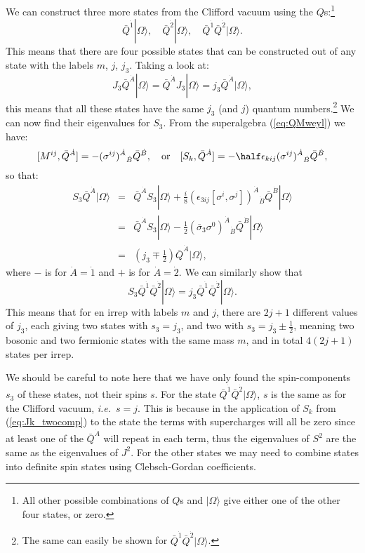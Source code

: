 \documentclass[notes.tex]{subfiles}
\begin{document}
We can construct three more states from the Clifford vacuum using the $Q$s:\footnote{All other possible combinations of $Q$s and $|\Omega\rangle$ give either one of the other four states, or zero.}
\[\bar{Q}^{\dot{1}}|\Omega\rangle,\quad\bar{Q}^{\dot{2}}|\Omega\rangle,\quad\bar{Q}^{\dot{1}}\bar{Q}^{\dot{2}}|\Omega\rangle.\]
This means that there are four possible states that can be constructed out of any state with the labels $m$, $j$, $j_3$. Taking a look at:
\[J_3 \bar{Q}^{\dot{A}}|\Omega\rangle = \bar{Q}^{\dot{A}}J_3 |\Omega\rangle = j_3\bar{Q}^{\dot{A}}|\Omega\rangle,\]
this means that all these states have the same $j_3$ (and $j$) quantum numbers.\footnote{The same can easily be shown for $\bar{Q}^{\dot{1}}\bar{Q}^{\dot{2}}|\Omega\rangle$.} 
We can now find their eigenvalues for $S_3$. From the superalgebra (\ref{eq:QMweyl}) we have:
\[[M^{ij}, \bar{Q}^{\dot{A}}] = -(\sigma^{ij})^{\dot{A}}{}_{\dot{B}}\bar{Q}^{\dot{B}},\quad\text{or}\quad [S_k, \bar{Q}^{\dot{A}}] = -\half\epsilon_{kij}(\sigma^{ij})^{\dot{A}}{}_{\dot{B}}\bar{Q}^{\dot{B}}, \]
so that:
\begin{eqnarray*}
S_3\bar{Q}^{\dot{A}}|\Omega\rangle &=&\bar{Q}^{\dot{A}}S_3|\Omega\rangle +\frac{i}{8}(\epsilon_{3ij}[\sigma^i,\sigma^j])^{\dot{A}}{}_{\dot{B}}\bar{Q}^{\dot{B}} |\Omega\rangle \\
&=& \bar{Q}^{\dot{A}}S_3|\Omega\rangle - \frac{1}{2}(\bar{\sigma}_3\sigma^0)^{\dot{A}}{}_{\dot{B}}\bar{Q}^{\dot{B}}|\Omega\rangle \\
&=& \left(j_3\mp \frac{1}{2}\right) \bar{Q}^{\dot{A}}|\Omega\rangle,
\end{eqnarray*}
where $-$ is for $\dot{A}=\dot{1}$ and $+$ is for $\dot{A}=\dot{2}$. We can similarly show that
\[S_3\bar{Q}^{\dot{1}}\bar{Q}^{\dot{2}}|\Omega\rangle = j_3\bar{Q}^{\dot{1}}\bar{Q}^{\dot{2}}|\Omega\rangle.\]
This means that for en irrep with labels $m$ and $j$, there are $2j+1$ different values of $j_3$, each giving two states with $s_3 = j_3$, and two with $s_3 = j_3\pm\frac{1}{2}$, meaning two bosonic and two fermionic states with the same mass $m$, and in total $4(2j+1)$ states per irrep. 

We should be careful to note here that we have only found the spin-components $s_3$ of these states, not their spins $s$. For the state $\bar{Q}^{\dot{1}}\bar{Q}^{\dot{2}}|\Omega\rangle$, $s$ is the same as for the Clifford vacuum, {\it i.e.}\ $s=j$. This is because in the application of $S_k$ from (\ref{eq:Jk_twocomp}) to the state the terms with supercharges will all be zero since at least one of the  $\bar{Q}^{\dot{A}}$ will repeat in each term, thus the eigenvalues of $S^2$ are the same as the eigenvalues of $J^2$. For the other states we may need to combine states into definite spin states using Clebsch-Gordan coefficients.
\end{document}
